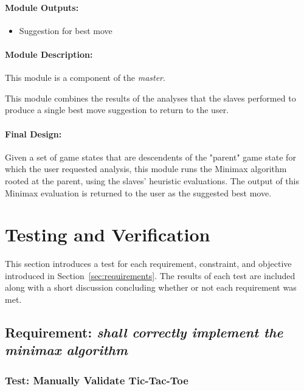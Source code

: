 \documentclass[pdftex,12pt,a4paper]{article}
\begin{document}
\paragraph{Module Outputs:}
\begin{itemize}
\item Suggestion for best move
\end{itemize}

\paragraph{Module Description:\\}
This module is a component of the \emph{master}.

This module combines the results of the analyses that the slaves performed to produce a single best move suggestion to return to the user.

\paragraph{Final Design:\\}
Given a set of game states that are descendents of the "parent" game state for which the user requested analysis, this module runs the Minimax algorithm rooted at the parent, using the slaves' heuristic evaluations. The output of this Minimax evaluation is returned to the user as the suggested best move.


%
%
\section{Testing and Verification}

This section introduces a test for each requirement, constraint, and objective introduced in Section~\ref{sec:requirements}. The results of each test are included along with a short discussion concluding whether or not each requirement was met.


\subsection{\textbf{Requirement:} \emph{shall correctly implement the minimax algorithm}}\label{sec:req-correctness}

\subsubsection{\textbf{Test:} Manually Validate Tic-Tac-Toe}
\end{document}
